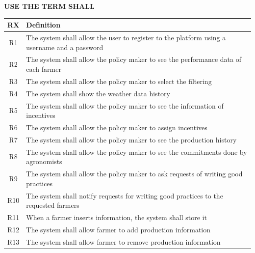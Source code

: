 \textbf{USE THE TERM SHALL}
\begin{center}
    \setlength\arrayrulewidth{1pt}
    \begin{longtable}{|c|m{}|}
            
            \hline
            \rowcolor{myblue}\color{white}RX & \color{white}Definition \\
            \hline
            
            \textsc{R1}  &    The system shall allow the user to register to the platform using a username and a password  \\
            \hline
            \hline
            \hline
            \hline
            \textsc{R2}     &   The system shall allow the policy maker to see the performance data of each farmer \\
            \hline
            \textsc{R3}  &    The system shall allow the policy maker to select the filtering \\
            \hline
            \textsc{R4}  &    The system shall show the weather data history \\
            \hline
            \textsc{R5}  &    The system shall allow the policy maker to see the information of incentives \\
            \hline
            \textsc{R6}  &    The system shall allow the policy maker to assign incentives \\
            \hline
            \textsc{R7}  &    The system shall allow the policy maker to see the production history \\
            \hline
            \textsc{R8}  &    The system shall allow the policy maker to see the commitments done by agronomists \\
            \hline
            \textsc{R9}  &    The system shall allow the policy maker to ask requests of  writing good practices \\
            \hline
            \textsc{R10}  &    The system shall notify requests for writing good practices to the requested farmers  \\
            \hline
            \hline
            \hline
            \textsc{R11}  &    When a farmer inserts information, the system shall store it  \\
            \hline
            \textsc{R12}  &    The system shall allow farmer to add production information  \\
            \textsc{R13}  &    The system shall allow farmer to remove production information  \\

\end{longtable}
\end{center}
